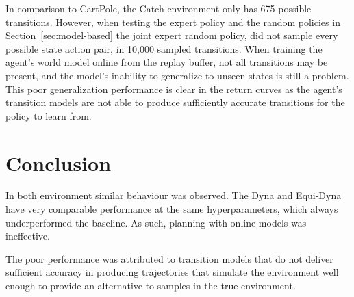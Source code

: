 In comparison to CartPole, the Catch environment only has 675 possible transitions. However, when testing the expert policy and the random policies in Section~\ref{sec:model-based} the joint expert random policy, did not sample every possible state action pair, in 10,000 sampled transitions. When training the agent's world model online from the replay buffer, not all transitions may be present, and the model's inability to generalize to unseen states is still a problem. This poor generalization performance is clear in the return curves as the agent's transition models are not able to produce sufficiently accurate transitions for the policy to learn from.


\section{Conclusion}
In both environment similar behaviour was observed. The Dyna and Equi-Dyna have very comparable performance at the same hyperparameters, which always underperformed the baseline. As such, planning with online models was ineffective.

The poor performance was attributed to transition models that do not deliver sufficient accuracy in producing trajectories that simulate the environment well enough to provide an alternative to samples in the true environment.

